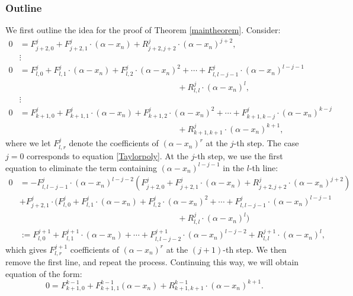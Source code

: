 \documentclass{article}
\begin{document}
\subsubsection{Outline}\label{outline}
 We first outline the idea for the proof of Theorem \ref{maintheorem}. Consider:
\begin{equation}\label{Taylorpoly2}
	\begin{aligned}
	 0 &= F_{j+2,0}^{j} + F_{j+2,1}^{j}\cdot (\alpha-x_{n}) + R_{j+2,j+2}^{j}\cdot (\alpha-x_{n})^{j+2},\\
	 &\vdots\\
	 0 &= F_{l,0}^{j} + F_{l,1}^{j}\cdot (\alpha-x_{n}) + F_{l,2}^{j}\cdot (\alpha-x_{n})^{2} + \cdots + F_{l, l-j-1}^{j}\cdot(\alpha-x_{n})^{l-j-1}\\
	 &\hspace{8cm} +R_{l,l}^{j}\cdot (\alpha-x_{n})^{l},\\
	 &\vdots\\
	 0 &= F_{k+1,0}^{j} + F_{k+1,1}^{j}\cdot (\alpha-x_{n}) + F_{k+1,2}^{j}\cdot (\alpha-x_{n})^{2} +  \cdots + F_{k+1,k-j}^{j}\cdot (\alpha-x_{n})^{k-j}\\
	 &\hspace{8cm} +R_{k+1,k+1}^{j}\cdot (\alpha-x_{n})^{k+1},
	\end{aligned}
\end{equation}
where we let $F_{l,r}^{j}$  denote the coefficients of $(\alpha-x_{n})^{r}$ at the $j$-th step. The case $j=0$ corresponds to equation \eqref{Taylorpoly}.  At the $j$-th step, we use the first equation to eliminate the term containing $(\alpha-x_{n})^{l-j-1}$ in the $l$-th line:
\begin{equation}\label{steps}
	\begin{aligned}
		0 &= -F_{l,l-j-1}^{j}\cdot (\alpha-x_{n})^{l-j-2}\left(F_{j+2,0}^{j} + F_{j+2,1}^{j}\cdot (\alpha-x_{n}) + R_{j+2,j+2}^{j}\cdot (\alpha-x_{n})^{j+2}\right)\\
		&
		+F_{j+2,1}^{j}\cdot \bigg(F_{l,0}^{j} + F_{l,1}^{j}\cdot (\alpha-x_{n}) + F_{l,2}^{j}\cdot (\alpha-x_{n})^{2} + \cdots + F_{l, l-j-1}^{j}\cdot(\alpha-x_{n})^{l-j-1}\\
		&\hspace{8cm} +R_{l,l}^{j}\cdot (\alpha-x_{n})^{l}\bigg)\\
		&:= F_{l,0}^{j+1} + F_{l,1}^{j+1}\cdot (\alpha-x_{n}) + \cdots + F_{l,l-j-2}^{j+1}\cdot (\alpha-x_{n})^{l-j-2}+
		R_{l,l}^{j+1}\cdot (\alpha-x_{n})^{l},
	\end{aligned}
\end{equation}
which gives $F_{l,r}^{j+1}$ coefficients of $(\alpha-x_{n})^{r}$ at the $(j+1)$-th step. We then remove the first line, and repeat the process. Continuing this way, we will obtain equation of the form:
\[
0 = F_{k+1,0}^{k-1} + F_{k+1,1}^{k-1}(\alpha-x_{n})+R_{k+1,k+1}^{k-1}\cdot (\alpha-x_{n})^{k+1}.
\]
\end{document}
